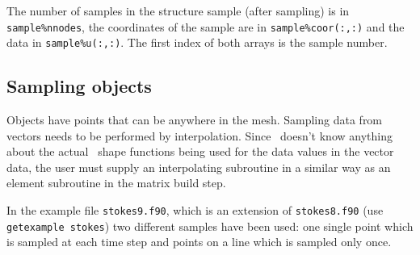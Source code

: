 The number of samples in the structure sample (after sampling) is in
\texttt{sample\%nnodes}, the coordinates of the sample are in
\texttt{sample\%coor(:,:)} and the data in \texttt{sample\%u(:,:)}. The first
index of both arrays is the sample number.

\subsection{Sampling objects}
\label{sec:samplingobjects}

Objects have points that can be anywhere in the mesh. Sampling data from
vectors needs to be performed by interpolation. Since \tfem\ doesn't know
anything about the actual \fem\ shape functions being used for the data values
in the vector data, the user must supply an interpolating subroutine in a
similar way as an element subroutine in the matrix build step.

In the example file \texttt{stokes9.f90}, which is an extension of
\texttt{stokes8.f90} (use \texttt{getexample stokes}) two different samples
have been used: one single point which is sampled at each time step and points
on a line which is sampled only once.

